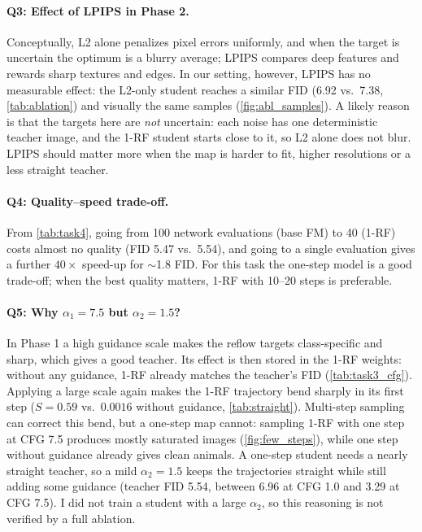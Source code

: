 \paragraph{Q3: Effect of LPIPS in Phase 2.}
Conceptually, L2 alone penalizes pixel errors uniformly, and when the target is uncertain the optimum is a blurry average; LPIPS compares deep features and rewards sharp textures and edges.
In our setting, however, LPIPS has no measurable effect: the L2-only student reaches a similar FID (6.92 vs.\ 7.38, \cref{tab:ablation}) and visually the same samples (\cref{fig:abl_samples}).
A likely reason is that the targets here are \emph{not} uncertain: each noise has one deterministic teacher image, and the 1-RF student starts close to it, so L2 alone does not blur.
LPIPS should matter more when the map is harder to fit, \eg higher resolutions or a less straight teacher.

\paragraph{Q4: Quality--speed trade-off.}
From \cref{tab:task4}, going from 100 network evaluations (base FM) to 40 (1-RF) costs almost no quality (FID 5.47 vs.\ 5.54), and going to a single evaluation gives a further $40\times$ speed-up for $\sim$1.8 FID.
For this task the one-step model is a good trade-off; when the best quality matters, 1-RF with 10--20 steps is preferable.

\paragraph{Q5: Why $\alpha_1=7.5$ but $\alpha_2=1.5$?}
In Phase 1 a high guidance scale makes the reflow targets class-specific and sharp, which gives a good teacher.
Its effect is then stored in the 1-RF weights: without any guidance, 1-RF already matches the teacher's FID (\cref{tab:task3_cfg}).
Applying a large scale again makes the 1-RF trajectory bend sharply in its first step ($S=0.59$ vs.\ $0.0016$ without guidance, \cref{tab:straight}).
Multi-step sampling can correct this bend, but a one-step map cannot: sampling 1-RF with one step at CFG 7.5 produces mostly saturated images (\cref{fig:few_steps}), while one step without guidance already gives clean animals.
A one-step student needs a nearly straight teacher, so a mild $\alpha_2=1.5$ keeps the trajectories straight while still adding some guidance (teacher FID 5.54, between 6.96 at CFG 1.0 and 3.29 at CFG 7.5).
I did not train a student with a large $\alpha_2$, so this reasoning is not verified by a full ablation.

